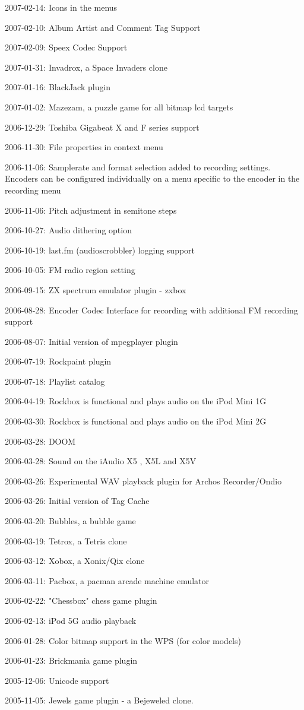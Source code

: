 \begin{changelog}
\item 2007-02-14: Icons in the menus
\item 2007-02-10: Album Artist and Comment Tag Support
\item 2007-02-09: Speex Codec Support
\item 2007-01-31: Invadrox, a Space Invaders clone
\item 2007-01-16: BlackJack plugin
\item 2007-01-02: Mazezam, a puzzle game for all bitmap lcd targets
\item 2006-12-29: Toshiba Gigabeat X and F series support
\item 2006-11-30: File properties in context menu
\item 2006-11-06: Samplerate and format selection added to recording
  settings. Encoders can be configured individually on a menu specific
  to the encoder in the recording menu
\item 2006-11-06: Pitch adjustment in semitone steps
\item 2006-10-27: Audio dithering option
\item 2006-10-19: last.fm (audioscrobbler) logging support
\item 2006-10-05: FM radio region setting
\item 2006-09-15: ZX spectrum emulator plugin - zxbox
\item 2006-08-28: Encoder Codec Interface for recording with
  additional FM recording support
\item 2006-08-07: Initial version of mpegplayer plugin
\item 2006-07-19: Rockpaint plugin
\item 2006-07-18: Playlist catalog
\item 2006-04-19: Rockbox is functional and plays audio on the iPod Mini 1G
\item 2006-03-30: Rockbox is functional and plays audio on the iPod Mini 2G
\item 2006-03-28: DOOM
\item 2006-03-28: Sound on the iAudio X5 , X5L and X5V
\item 2006-03-26: Experimental WAV playback plugin for Archos Recorder/Ondio
\item 2006-03-26: Initial version of Tag Cache
\item 2006-03-20: Bubbles, a bubble game
\item 2006-03-19: Tetrox, a Tetris clone
\item 2006-03-12: Xobox, a Xonix/Qix clone
\item 2006-03-11: Pacbox, a pacman arcade machine emulator
\item 2006-02-22: "Chessbox" chess game plugin
\item 2006-02-13: iPod 5G audio playback
\item 2006-01-28: Color bitmap support in the WPS (for color models)
\item 2006-01-23: Brickmania game plugin
\item 2005-12-06: Unicode support
\item 2005-11-05: Jewels game plugin - a Bejeweled clone.
\end{changelog}

